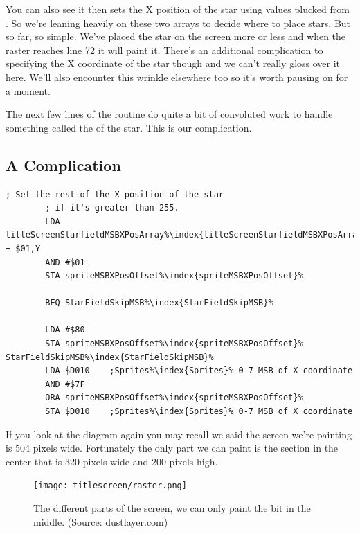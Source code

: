 You can also see it then sets the X position of the star using values plucked from .
So we're leaning heavily on these two arrays to decide where to place stars. But so far, so simple. We've placed the star
on the screen more or less and when the raster reaches line 72 it will paint it. There's an additional complication to 
specifying the X coordinate of the star though and we can't really gloss over it here. We'll also encounter this
wrinkle elsewhere too so it's worth pausing on for a moment.

The next few lines of the routine do quite a bit of convoluted work to handle something called the  of the
star. This is our complication. 

\subsection{A Complication}
\begin{lstlisting}[caption= MSBXPos.. some'it.,escapechar=\%]
        ; Set the rest of the X position of the star
        ; if it's greater than 255.
        LDA titleScreenStarfieldMSBXPosArray%\index{titleScreenStarfieldMSBXPosArray}% + $01,Y
        AND #$01
        STA spriteMSBXPosOffset%\index{spriteMSBXPosOffset}%

        BEQ StarFieldSkipMSB%\index{StarFieldSkipMSB}%

        LDA #$80
        STA spriteMSBXPosOffset%\index{spriteMSBXPosOffset}%
StarFieldSkipMSB%\index{StarFieldSkipMSB}%   
        LDA $D010    ;Sprites%\index{Sprites}% 0-7 MSB of X coordinate
        AND #$7F
        ORA spriteMSBXPosOffset%\index{spriteMSBXPosOffset}%
        STA $D010    ;Sprites%\index{Sprites}% 0-7 MSB of X coordinate

\end{lstlisting}

If you look at the diagram again you may recall we said the screen we're painting is 504 pixels wide. Fortunately the only 
part we can paint is the section in the center that is 320 pixels wide and 200 pixels high. 

\begin{figure}[H]
    \centering
      \texttt{[image: titlescreen/raster.png]}%
  \caption{The different parts of the screen, we can only paint the bit in the middle. (Source: dustlayer.com)}
\end{figure}

